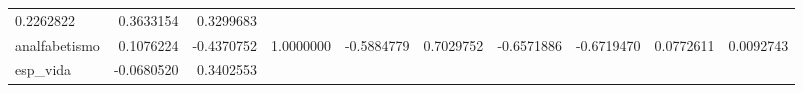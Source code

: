 \documentclass[]{article}
\begin{document}
\begin{longtable}[]{@{}lrrrrrrrrr@{}}
\begin{minipage}[t]{0.07\columnwidth}
0.2262822\strut
\end{minipage} & \begin{minipage}[t]{0.07\columnwidth}\raggedleft\strut
0.3633154\strut
\end{minipage} & \begin{minipage}[t]{0.09\columnwidth}\raggedleft\strut
0.3299683\strut
\end{minipage}\tabularnewline
\begin{minipage}[t]{0.09\columnwidth}\raggedright\strut
analfabetismo\strut
\end{minipage} & \begin{minipage}[t]{0.07\columnwidth}\raggedleft\strut
0.1076224\strut
\end{minipage} & \begin{minipage}[t]{0.07\columnwidth}\raggedleft\strut
-0.4370752\strut
\end{minipage} & \begin{minipage}[t]{0.09\columnwidth}\raggedleft\strut
1.0000000\strut
\end{minipage} & \begin{minipage}[t]{0.07\columnwidth}\raggedleft\strut
-0.5884779\strut
\end{minipage} & \begin{minipage}[t]{0.07\columnwidth}\raggedleft\strut
0.7029752\strut
\end{minipage} & \begin{minipage}[t]{0.07\columnwidth}\raggedleft\strut
-0.6571886\strut
\end{minipage} & \begin{minipage}[t]{0.07\columnwidth}\raggedleft\strut
-0.6719470\strut
\end{minipage} & \begin{minipage}[t]{0.07\columnwidth}\raggedleft\strut
0.0772611\strut
\end{minipage} & \begin{minipage}[t]{0.09\columnwidth}\raggedleft\strut
0.0092743\strut
\end{minipage}\tabularnewline
\begin{minipage}[t]{0.09\columnwidth}\raggedright\strut
esp\_vida\strut
\end{minipage} & \begin{minipage}[t]{0.07\columnwidth}\raggedleft\strut
-0.0680520\strut
\end{minipage} & \begin{minipage}[t]{0.07\columnwidth}\raggedleft\strut
0.3402553\strut
\end{minipage} & \begin{minipage}[t]{0.09\columnwidth}\raggedleft\strut

\end{minipage}
\end{longtable}
\end{document}
